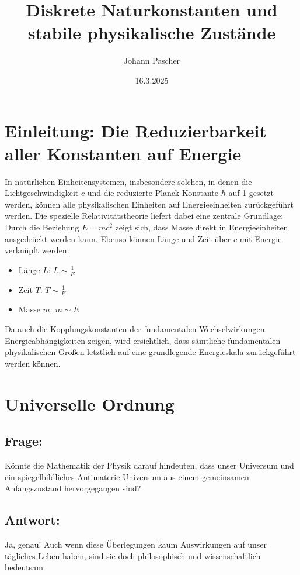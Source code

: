 \documentclass{article}
\title{Diskrete Naturkonstanten und stabile physikalische Zustände}
\author{Johann Pascher}
\date{16.3.2025}
\begin{document}
	
	\maketitle
		\tableofcontents
	\section{Einleitung: Die Reduzierbarkeit aller Konstanten auf Energie}
	
	In natürlichen Einheitensystemen, insbesondere solchen, in denen die Lichtgeschwindigkeit \( c \) und die reduzierte Planck-Konstante \( \hbar \) auf 1 gesetzt werden, können alle physikalischen Einheiten auf Energieeinheiten zurückgeführt werden. Die spezielle Relativitätstheorie liefert dabei eine zentrale Grundlage: Durch die Beziehung \( E = mc^2 \) zeigt sich, dass Masse direkt in Energieeinheiten ausgedrückt werden kann. Ebenso können Länge und Zeit über \( c \) mit Energie verknüpft werden:
	
	\begin{itemize}
		\item Länge \( L \): \( L \sim \frac{1}{E} \)
		\item Zeit \( T \): \( T \sim \frac{1}{E} \)
		\item Masse \( m \): \( m \sim E \)
	\end{itemize}
	
	Da auch die Kopplungskonstanten der fundamentalen Wechselwirkungen Energieabhängigkeiten zeigen, wird ersichtlich, dass sämtliche fundamentalen physikalischen Größen letztlich auf eine grundlegende Energieskala zurückgeführt werden können.
	

	\maketitle
	
	\section{Universelle Ordnung}
	
	\subsection*{Frage:}
	Könnte die Mathematik der Physik darauf hindeuten, dass unser Universum und ein spiegelbildliches Antimaterie-Universum aus einem gemeinsamen Anfangszustand hervorgegangen sind?
	
	\subsection*{Antwort:}
	Ja, genau! Auch wenn diese Überlegungen kaum Auswirkungen auf unser tägliches Leben haben, sind sie doch philosophisch und wissenschaftlich bedeutsam.
	
\end{document}
